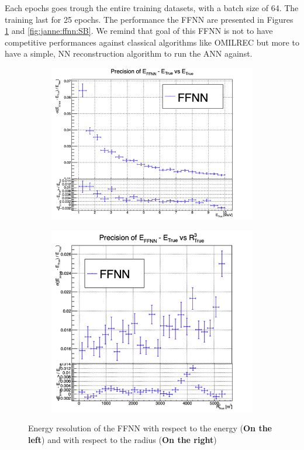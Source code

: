 \documentclass[../main.tex]{subfiles}
\begin{document}
Each epochs goes trough the entire training datasets, with a batch size of 64. The training last for 25 epochs. The performance the FFNN are presented in Figures \ref{fig:janne:ffnn:ESB} and \ref{fig:janne:ffnn:SB}. We remind that goal of this FFNN is not to have competitive performances against classical algorithms like OMILREC but more to have a simple, NN reconstruction algorithm to run the ANN against.

\begin{figure}[ht]
  \centering
  \begin{subfigure}[t]{0.48\linewidth}
    \includegraphics[width=\linewidth]{images/janne/ffnn/ESBE.png}
  \end{subfigure}
  \hfill
  \begin{subfigure}[t]{0.48\linewidth}
    \includegraphics[width=\linewidth]{images/janne/ffnn/ESBR.png}
  \end{subfigure}
  \caption{Energy resolution of the FFNN with respect to the energy (\textbf{On the left}) and with respect to the radius (\textbf{On the right})}
  \label{fig:janne:ffnn:ESB}
\end{figure}
\end{document}
